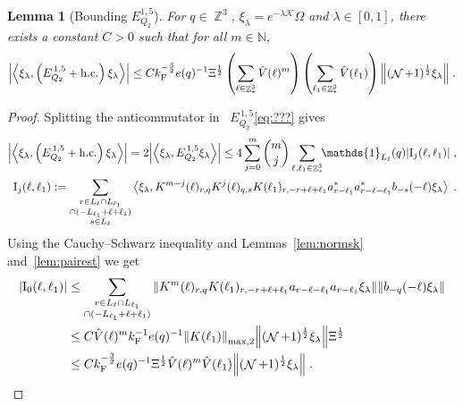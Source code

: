 \documentclass[12pt,a4paper]{article}
\numberwithin{equation}{section}
\newcommand{\cK}{\mathcal{K}}
\newcommand{\NNN}{\mathbb{N}}
\newcommand{\1}{\mathbb{I}}
\newcommand{\F}{\mathrm{F}}
\newcommand{\I}{\mathrm{I}}
\DeclareMathOperator{\Z}{\mathbb{Z}}
\DeclareMathOperator{\NN}{\mathcal{N}}
\newcommand{\half}{\frac{1}{2}}
\newcommand{\eva}[1]{\left\langle #1 \right\rangle}
\theoremstyle{plain}
\newtheorem{lemma}[theorem]{Lemma}
\theoremstyle{definition}
\theoremstyle{remark}
\theoremstyle{plain}
\theoremstyle{definition}
\theoremstyle{remark}
\begin{document}
\begin{lemma}[Bounding $E_{Q_2}^{1,5}$]\label{lem:EQ215}
For $ q \in \Z^3 $, $\xi_\lambda = e^{-\lambda \cK} \Omega$ and $ \lambda \in [0,1] $, there exists a constant $ C > 0 $ such that for all $ m \in \NNN $,
\begin{align}
	\abs{\eva{\xi_\lambda,\left(E^{\,1,5}_{Q_2}+\mathrm{h.c.}\right) \xi_\lambda }}
	\leq C k_{\F}^{-\frac{3}{2}} e(q)^{-1} \Xi^{\half} \left(\sum\limits_{\ell\in \Z^3_*} \hat{V}(\ell)^m \right) \left(\sum\limits_{\ell_1\in \Z^3_*} \hat{V}(\ell_1) \right) \norm{(\NN+1)^\half \xi_\lambda } \;. \label{eq:estEQ215}
\end{align}
\end{lemma}

\begin{proof}
Splitting the anticommutator in~ $ E^{\,1,5}_{Q_2} $\eqref{eq:???} gives
\begin{equation} \label{eq:EQ2151}
\begin{aligned}
	\abs{\eva{\xi_\lambda,\left(E^{\,1,5}_{Q_2}+\mathrm{h.c.}\right) \xi_\lambda }} 
	= 2\abs{\eva{\xi_\lambda, E^{\,1,5}_{Q_2} \xi_\lambda }}
	\le 4 \sum_{j=0}^m {{m}\choose j} \sum\limits_{\ell,\ell_1  \in \Z^3_*}\!\! \mathds{1}_{L_\ell}(q) |\I_j(\ell, \ell_1)| \;,\\
	\I_j(\ell, \ell_1)
	:= \sum\limits_{\substack{r\in L_{\ell} \cap L_{\ell_1}\\ \cap (-L_{\ell_1}+\ell+\ell_1)\\ s \in L_{\ell}}} 
		\eva{\xi_\lambda, K^{m-j}(\ell)_{r,q} K^{j}(\ell)_{q,s} K(\ell_1)_{r,-r+\ell+\ell_1} a^*_{r-\ell_1} a^*_{r-\ell-\ell_1} b_{-s}(-\ell) \xi_\lambda} \;. \\
\end{aligned}
\end{equation}
Using the Cauchy--Schwarz inequality and Lemmas~\ref{lem:normsk} and~\ref{lem:pairest} we get
\begin{align}
    |\I_0(\ell, \ell_1)|
	&\leq \sum\limits_{\substack{r\in L_{\ell} \cap L_{\ell_1} \\ \cap (-L_{\ell_1}+\ell+\ell_1)}} \norm{K^m(\ell)_{r,q} K(\ell_1)_{r,-r+\ell+\ell_1} a_{r-\ell-\ell_1} a_{r-\ell_1} \xi_\lambda}\norm{  b_{-q}(-\ell) \xi_\lambda}\nonumber\\
	&\leq C \hat{V}(\ell)^m k_{\F}^{-1} e(q)^{-1}
		\norm{K(\ell_1)}_{\max,2} \norm{ (\NN+1)^\half \xi_\lambda } \Xi^{\half} \nonumber\\
	&\leq C k_{\F}^{-\frac 32} e(q)^{-1} \Xi^{\half} \hat{V}(\ell)^m \hat{V}(\ell_1) \norm{ (\NN+1)^\half \xi_\lambda } \;. \label{eq:estEQ2151}

\end{align}
\end{proof}
\end{document}

